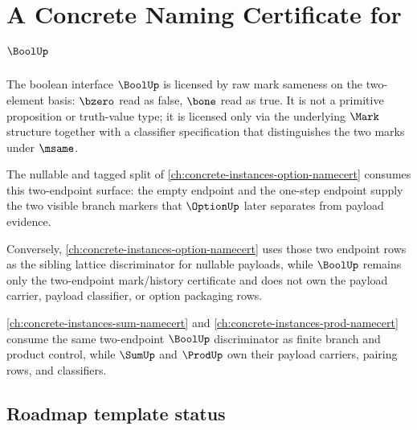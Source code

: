 \chapter{A Concrete Naming Certificate for \(\BoolUp\)}
\label{ch:concrete-instances-bool-namecert}

The boolean interface \(\BoolUp\) is licensed by raw mark sameness on the two-element basis: \(\bzero\) read as false, \(\bone\) read as true. It is not a primitive proposition or truth-value type; it is licensed only via the underlying \(\Mark\) structure together with a classifier specification that distinguishes the two marks under \(\msame\).

The nullable and tagged split of \autoref{ch:concrete-instances-option-namecert} consumes this two-endpoint surface: the empty endpoint and the one-step endpoint supply the two visible branch markers that $\OptionUp$ later separates from payload evidence.

Conversely, \autoref{ch:concrete-instances-option-namecert} uses those two endpoint rows as the sibling lattice discriminator for nullable payloads, while $\BoolUp$ remains only the two-endpoint mark/history certificate and does not own the payload carrier, payload classifier, or option packaging rows.

\autoref{ch:concrete-instances-sum-namecert} and \autoref{ch:concrete-instances-prod-namecert} consume the same two-endpoint $\BoolUp$ discriminator as finite branch and product control, while $\SumUp$ and $\ProdUp$ own their payload carriers, pairing rows, and classifiers.

\section{Roadmap template status}

